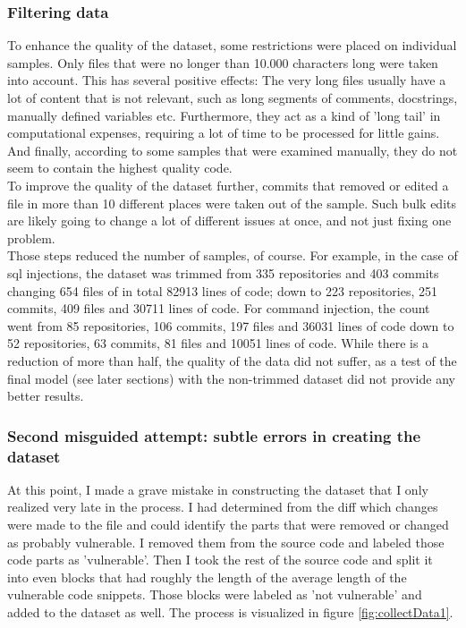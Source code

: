 \documentclass[
a4paper,
pagesize,
pdftex,
12pt,
twoside, %
BCOR=5mm, %
ngerman,
fleqn,
final,
]{scrartcl}
\begin{document}
	\subsubsection{Filtering data}
	To enhance the quality of the dataset, some restrictions were placed on individual samples. Only files that were no longer than 10.000 characters long were taken into account. This has several positive effects: The very long files usually have a lot of content that is not relevant, such as long segments of comments, docstrings, manually defined variables etc. Furthermore, they act as a kind of 'long tail' in computational expenses, requiring a lot of time to be processed for little gains. And finally, according to some samples that were examined manually, they do not seem to contain the highest quality code.\\
	To improve the quality of the dataset further, commits that removed or edited a file in more than 10 different places were taken out of the sample. Such bulk edits are likely going to change a lot of different issues at once, and not just fixing one problem.\\
	Those steps reduced the number of samples, of course. For example, in the case of sql injections, the dataset was trimmed from 335 repositories and 403 commits changing 654 files of in total 82913 lines of code; down to 223 repositories, 251 commits, 409 files and 30711 lines of code. For command injection, the count went from 85 repositories, 106 commits, 197 files and 36031 lines of code down to 52 repositories, 63 commits, 81 files and 10051 lines of code. While there is a reduction of more than half, the quality of the data did not suffer, as a test of the final model (see later sections) with the non-trimmed dataset did not provide any better results.
	
	\subsubsection{Second misguided attempt: subtle errors in creating the dataset}
	At this point, I made a grave mistake in constructing the dataset that I only realized very late in the process. I had determined from the diff which changes were made to the file and could identify the parts that were removed or changed as probably vulnerable. I removed them from the source code and labeled those code parts as 'vulnerable'. Then I took the rest of the source code and split it into even blocks that had roughly the length of the average length of the vulnerable code snippets. Those blocks were labeled as 'not vulnerable' and added to the dataset as well. The process is visualized in figure \ref{fig:collectData1}.
	
\end{document}

